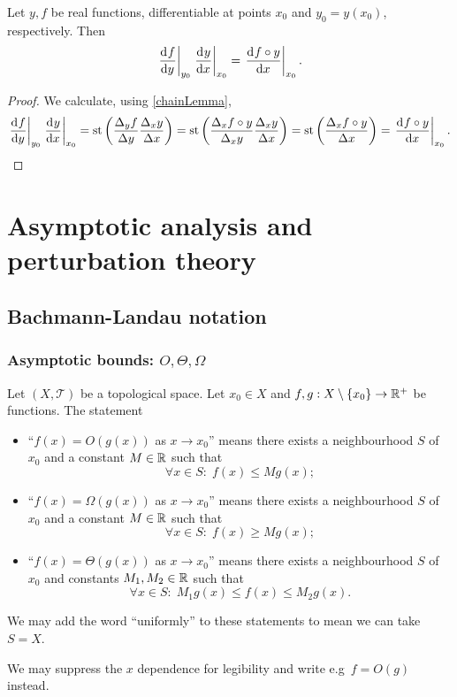 \begin{proposition}
Let $y,f$ be real functions, differentiable at points $x_0$ and $y_0=y(x_0)$, respectively. Then
\[ \left.\mathinner{ \dfrac{\operatorname{d \!}{^{}}f}{\operatorname{d \!}{{y}^{}}} }\right|_{y_0} \left.\mathinner{ \dfrac{\operatorname{d \!}{^{}}y}{\operatorname{d \!}{{x}^{}}} }\right|_{x_0} = \left.\mathinner{ \dfrac{\operatorname{d \!}{^{}}f\circ y}{\operatorname{d \!}{{x}^{}}} }\right|_{x_0}. \]
\end{proposition}
\begin{proof}
We calculate, using \ref{chainLemma},
\[ \left.\mathinner{ \dfrac{\operatorname{d \!}{^{}}f}{\operatorname{d \!}{{y}^{}}} }\right|_{y_0} \left.\mathinner{ \dfrac{\operatorname{d \!}{^{}}y}{\operatorname{d \!}{{x}^{}}} }\right|_{x_0} = \operatorname{st}\left(\frac{\Delta_y f}{\Delta y}\frac{\Delta_x y}{\Delta x}\right) = \operatorname{st}\left(\frac{\Delta_x f\circ y}{\Delta_x y}\frac{\Delta_x y}{\Delta x}\right) = \operatorname{st}\left(\frac{\Delta_x f\circ y}{\Delta x}\right) = \left.\mathinner{ \dfrac{\operatorname{d \!}{^{}}f\circ y}{\operatorname{d \!}{{x}^{}}} }\right|_{x_0}. \]
\end{proof}

\chapter{Asymptotic analysis and perturbation theory}
\section{Bachmann-Landau notation}
\subsection{Asymptotic bounds: $O, \Theta, \Omega$}
\begin{definition}
Let $(X,\mathcal{T})$ be a topological space. Let $x_0 \in X$ and $f,g: X\setminus\{x_0\}\to \mathbb{R}^+$ be functions. The statement
\begin{itemize}
\item ``$f(x) = O(g(x))$ as $x\to x_0$'' means there exists a neighbourhood $S$ of $x_0$ and a constant $M\in\mathbb{R}$ such that
\[ \forall x\in S:\; f(x) \leq Mg(x); \]
\item ``$f(x) = \Omega(g(x))$ as $x\to x_0$'' means there exists a neighbourhood $S$ of $x_0$ and a constant $M\in\mathbb{R}$ such that
\[ \forall x\in S:\; f(x) \geq Mg(x); \]
\item ``$f(x) = \Theta(g(x))$ as $x\to x_0$'' means there exists a neighbourhood $S$ of $x_0$ and constants $M_1,M_2\in\mathbb{R}$ such that
\[ \forall x\in S:\; M_1g(x) \leq f(x) \leq M_2g(x). \]
\end{itemize}
We may add the word ``uniformly'' to these statements to mean we can take $S=X$.

We may suppress the $x$ dependence for legibility and write e.g\ $f = O(g)$ instead.
\end{definition}

